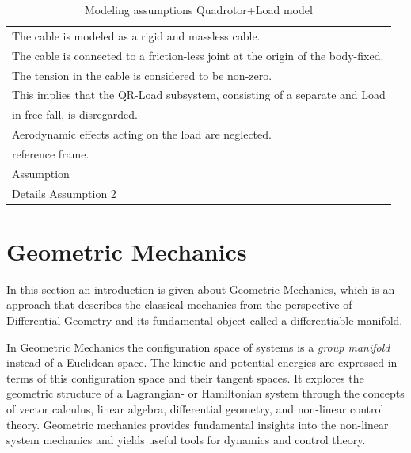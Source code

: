 \begin{table}[h!]
	\centering
	\begin{tabular}{|p{\textwidth}|}
		\hline
		\tabitem The cable is modeled as a rigid and massless cable. \\
		\tabitem The cable is connected to a friction-less joint at the origin of the body-fixed. \\
		\tabitem The tension in the cable is considered to be non-zero.\\
		\hspace{4mm} This implies that the QR-Load subsystem, consisting of a separate \a{qr} and Load\\
		\hspace{4mm} in free fall, is disregarded.\\		 
		\tabitem Aerodynamic effects acting on the load are neglected.\\
		\hspace{4mm} reference frame.\\
		\tabitem Assumption \\
		\hspace{4mm} Details Assumption 2\\
		\hline
	\end{tabular}
	\caption{Modeling assumptions Quadrotor+Load model}
	\label{tab:mod.assumptionsQRL}
\end{table}


\section{Geometric Mechanics}\label{sec:mod.geometric}

In this section an introduction is given about Geometric Mechanics, which is an approach that describes the classical mechanics from the perspective of Differential Geometry and its fundamental object called a differentiable manifold.

In Geometric Mechanics the configuration space of systems is a \textit{group manifold} instead of a Euclidean space. The kinetic and potential energies are expressed in terms of this configuration space and their tangent spaces. It explores the geometric structure of a Lagrangian- or Hamiltonian system through the concepts of vector calculus, linear algebra, differential geometry, and non-linear control theory. Geometric mechanics provides fundamental insights into the non-linear system mechanics and yields useful tools for dynamics and control theory.


